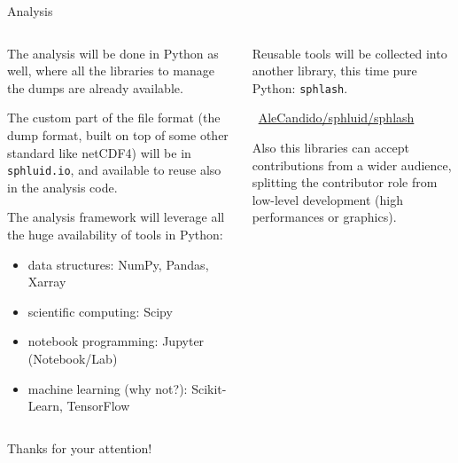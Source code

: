 \documentclass[9pt]{beamer}
\newcommand{\sphlash}{\texttt{sphlash}\xspace}
\begin{document}
\begin{frame}{Analysis}
    \begin{columns}
        \begin{column}{0.5\textwidth}
            The analysis will be done in Python as well, where all the
            libraries to manage the dumps are already available.

            The custom part of the file format (the dump format, built on top
            of some other standard like netCDF4) will be in
            \texttt{sphluid.io}, and available to reuse also in the analysis
            code.
            \vspace*{10pt}

            The analysis framework will leverage all the huge availability of
            tools in Python:
            \begin{itemize}
                \item data structures: NumPy, Pandas, Xarray
                \item scientific computing: Scipy
                \item notebook programming: Jupyter (Notebook/Lab)
                \item machine learning (why not?): Scikit-Learn, TensorFlow
            \end{itemize}
        \end{column}
        \begin{column}{0.5\textwidth}
            Reusable tools will be collected into another library, this time
            pure Python: \sphlash.

            \begin{center}
                ~\href{https://github.com/AleCandido/sphluid/tree/main/sphlash}{AleCandido/sphluid/sphlash}
            \end{center}

            Also this libraries can accept contributions from a wider audience,
            splitting the contributor role from low-level development (high
            performances or graphics).
        \end{column}
    \end{columns}
\end{frame}


\begin{frame}[standout]
    Thanks for your attention!
\end{frame}

\appendix
\end{document}
